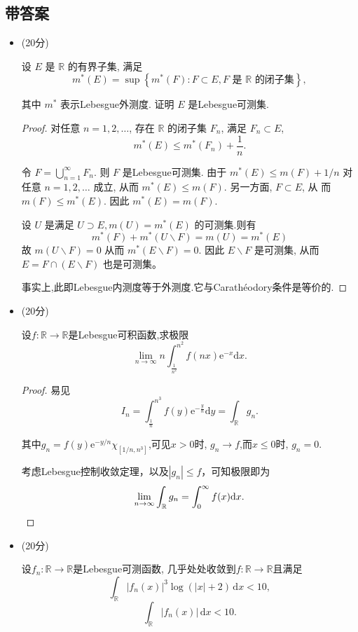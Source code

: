 \subsection{带答案}
\begin{itemize}
\item[一、](20分)

设 $E$ 是 $\mathbb{R}$ 的有界子集, 满足
$$
m^*(E)=\sup \left\{m^*(F): F \subset E, F \text { 是 } \mathbb{R} \text { 的闭子集}\right\},
$$

其中 $m^*$ 表示Lebesgue外测度. 证明 $E$ 是Lebesgue可测集.
\begin{proof}
对任意 $n=1,2, \ldots$, 存在 $\mathbb{R}$ 的闭子集 $F_n$, 满足 $F_n \subset E$,
$$
m^*(E) \leq m^*(F_n)+\frac{1}{n}.
$$

令 $F=\bigcup_{n=1}^{\infty} F_n$. 则 $F$ 是Lebesgue可测集. 由于 $m^*(E) \leq m(F)+1 / n$ 对 任意 $n=1,2, \ldots$ 成立, 从而 $m^*(E) \leq m(F)$. 另一方面, $F \subset E$, 从 而 $m(F) \leq m^*(E)$. 因此 $m^*(E)=m(F)$.

设 $U$ 是满足 $U \supset E, m(U)=m^*(E)$ 的可测集.则有
$$
m^*(F)+m^*(U \backslash F)=m(U) = m^*(E)
$$
故
$
m(U \backslash F)=0
$
从而 $m^*(E \backslash F)=0$. 因此 $E \backslash F$ 是可测集, 从而
$
E=F \cap(E \backslash F)
$
也是可测集。

事实上,此即Lebesgue内测度等于外测度.它与Carathéodory条件是等价的.
\end{proof}

\item[二、](20分)

设$ f\colon\mathbb{R} \to \mathbb{R}  $是Lebesgue可积函数,求极限
$$
\lim_{n\rightarrow \infty}n\int_{\frac{1}{n^2}}^{n^2}{f( nx ) \text{e}^{-x}\text{d}x}.
$$

\begin{proof}
易见
$$
I_n=\int_{\frac{1}{n}}^{n^3}{f( y ) \text{e}^{-\frac{y}{n}}\text{d}y}=\int_{\mathbb{R}}{g_n}.
$$

其中$ g_{n}=f( y ) \text{e}^{-y/n}\chi_{[1/n,n^{3}]} $,可见$ x>0 $时, $ g_{n}\to f $,而$ x\le 0 $时, $ g_{n}=0 $.

考虑Lebesgue控制收敛定理，以及$ |g_{n}|\le f $，可知极限即为
$$
\lim_{n\rightarrow \infty}\int_{\mathbb{R}}^{}{g_n}=\int_0^{\infty}{f( x ) \text{d}x}.\qedhere
$$
\end{proof}

\item[三、](20分)

设$ f_{n}\colon\mathbb{R} \to \mathbb{R}  $是Lebesgue可测函数,
几乎处处收敛到$ f\colon\mathbb{R} \to \mathbb{R} $且满足
$$\int_{\mathbb{R}}{|f_n(x)|^3\log(|x|+2)\,\text{d}x}<10,$$
$$\int_{\mathbb{R}}{|f_n(x)|\,\text{d}x}<10.$$


\end{itemize}
